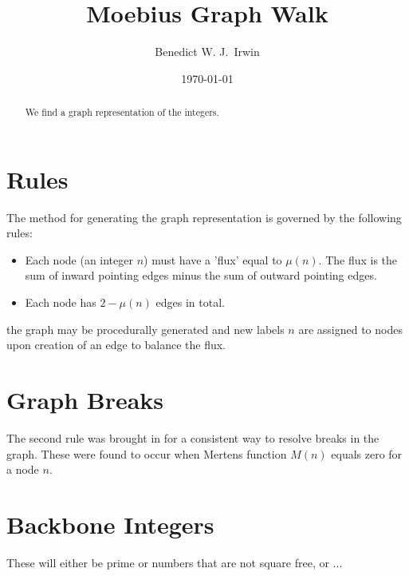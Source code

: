 \documentclass{article}
\title{Moebius Graph Walk}
\date{\today}
\begin{document}

\author[1,2]{Benedict W. J.~Irwin}


\maketitle

\begin{abstract}
We find a graph representation of the integers.
\end{abstract}

\section{Rules}
The method for generating the graph representation is governed by the following rules:
\begin{itemize}
\item Each node (an integer $n$) must have a 'flux' equal to $\mu(n)$. The flux is the sum of inward pointing edges minus the sum of outward pointing edges.
\item Each node has $2-\mu(n)$ edges in total.
\end{itemize}
the graph may be procedurally generated and new labels $n$ are assigned to nodes upon creation of an edge to balance the flux.



\section{Graph Breaks}
The second rule was brought in for a consistent way to resolve breaks in the graph. These were found to occur when Mertens function $M(n)$ equals zero for a node $n$.

\section{Backbone Integers}
These will either be prime or numbers that are not square free, or ...
\end{document}
